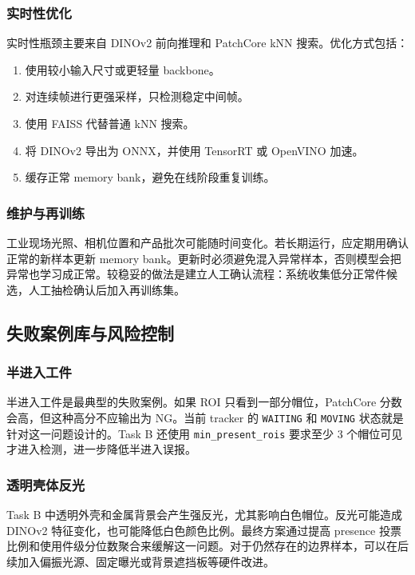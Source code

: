 \documentclass[12pt,hyperref,a4paper,UTF8,fontset=fandol]{ctexart}
\begin{document}
\subsubsection{实时性优化}

实时性瓶颈主要来自 DINOv2 前向推理和 PatchCore kNN 搜索。优化方式包括：

\begin{enumerate}[label=\arabic*.]
    \item 使用较小输入尺寸或更轻量 backbone。
    \item 对连续帧进行更强采样，只检测稳定中间帧。
    \item 使用 FAISS 代替普通 kNN 搜索。
    \item 将 DINOv2 导出为 ONNX，并使用 TensorRT 或 OpenVINO 加速。
    \item 缓存正常 memory bank，避免在线阶段重复训练。
\end{enumerate}

\subsubsection{维护与再训练}

工业现场光照、相机位置和产品批次可能随时间变化。若长期运行，应定期用确认正常的新样本更新 memory bank。更新时必须避免混入异常样本，否则模型会把异常也学习成正常。较稳妥的做法是建立人工确认流程：系统收集低分正常件候选，人工抽检确认后加入再训练集。

\newpage
\subsection{失败案例库与风险控制}

\subsubsection{半进入工件}

半进入工件是最典型的失败案例。如果 ROI 只看到一部分帽位，PatchCore 分数会高，但这种高分不应输出为 NG。当前 tracker 的 \texttt{WAITING} 和 \texttt{MOVING} 状态就是针对这一问题设计的。Task B 还使用 \texttt{min\_present\_rois} 要求至少 3 个帽位可见才进入检测，进一步降低半进入误报。

\subsubsection{透明壳体反光}

Task B 中透明外壳和金属背景会产生强反光，尤其影响白色帽位。反光可能造成 DINOv2 特征变化，也可能降低白色颜色比例。最终方案通过提高 presence 投票比例和使用件级分位数聚合来缓解这一问题。对于仍然存在的边界样本，可以在后续加入偏振光源、固定曝光或背景遮挡板等硬件改进。
\end{document}
